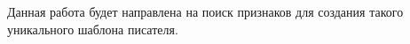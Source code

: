 \documentclass{article}
\begin{document}
Данная работа будет направлена на поиск признаков для создания такого уникального шаблона писателя.










\end{document}
